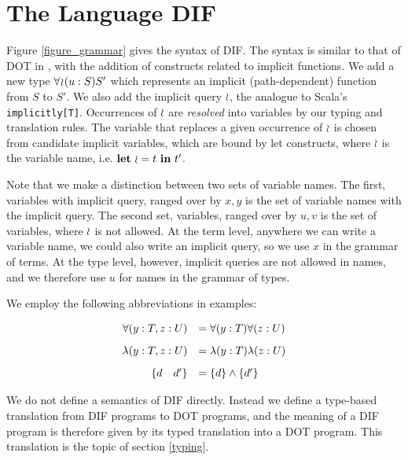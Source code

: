 \section{The Language DIF}
Figure \ref{figure_grammar} gives the syntax of DIF. The syntax is similar to
that of DOT in \cite{AGORS16}, with the addition of constructs related to
implicit functions. We add a new type $\forall\!\wr\!(u:S)S'$ which represents an
implicit (path-dependent) function from $S$ to $S'$. We also add the implicit
query $\wr$, the analogue to Scala's \texttt{implicitly[T]}. Occurrences of
$\wr$ are \emph{resolved} into variables by our typing and translation rules.
The variable that replaces a given occurrence of $\wr$ is chosen from
candidate implicit variables, which are bound by let constructs, where $\wr$
is the variable name, i.e. $\textbf{let}\ \wr = t\ \textbf{in}\ t'$.

Note that we make a distinction between two sets of variable names. The first,
variables with implicit query, ranged over by $x, y$ is the set of variable
names with the implicit query. The second set, variables, ranged over by $u, v$
is the set of variables, where $\wr$ is not allowed. At the term level,
anywhere we can write a variable name, we could also write an implicit query,
so we use $x$ in the grammar of terms. At the type level, however, implicit
queries are not allowed in names, and we therefore use $u$ for names in the
grammar of types.

\begin{figure*}[h]
    
    \caption{Grammar of DIF}
    \label{figure_grammar}
\end{figure*}

We employ the following abbreviations in examples:

\[\begin{array}{r l}
    \forall(y: T, z: U) &= \forall(y: T)\forall(z: U) \\[3mm]
    \lambda(y: T, z: U) &= \lambda(y: T)\lambda(z: U) \\[3mm]
    \{d \quad d'\} &= \{d\} \wedge \{d'\}
\end{array}\]

We do not define a semantics of DIF directly. Instead we define a type-based
translation from DIF programs to DOT programs, and the meaning of a DIF program
is therefore given by its typed translation into a DOT program. This
translation is the topic of section \ref{typing}.

